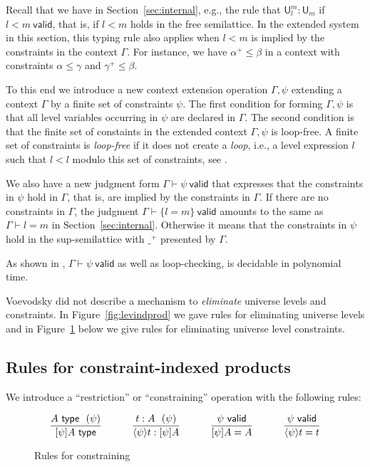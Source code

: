 \documentclass[11pt,a4paper]{article}
\theoremstyle{definition}
\newcommand{\UU}{\mathsf{U}}
\newcommand{\valid}{\mathsf{valid}}
\newcommand{\type}{\mathsf{type}}
\newcommand{\lam}[1]{{\langle}#1{\rangle}}
\newcommand{\set}[1]{\{#1\}}
\begin{document}
Recall that we have in Section~\ref{sec:internal}, e.g., the rule
that $\UU^m_l:\UU_m$ if $l<m~\valid$, that is, if
$l<m$ holds in the free semilattice. %
In the extended system in this section, this typing rule also applies
when $l<m$ is implied by the constraints in the context $\Gamma$.
For instance, we have $\alpha^+\leqslant\beta$ in a context
with constraints $\alpha\leqslant\gamma$ and $\gamma^+\leqslant\beta$.

To this end we introduce a new context extension operation $\Gamma,\psi$
extending a context $\Gamma$ by a finite set of constraints $\psi$.
The first condition for forming $\Gamma,\psi$ is that all level variables
occurring in $\psi$ are declared in $\Gamma$. The second condition
is that the finite set of constaints in the extended context
$\Gamma,\psi$ is loop-free.
A finite set of constraints is {\em loop-free} if it does not
create a {\em loop}, i.e., a level expression $l$ such that $l<l$
modulo this set of constraints, see \cite{bezem-coquand:lattices}.


We also have a new judgment form $\Gamma\vdash\psi~\valid$ that expresses
that the constraints in $\psi$ hold in $\Gamma$, that is,
are implied by the constraints in $\Gamma$. If there are
no constraints in $\Gamma$, the judgment $\Gamma\vdash\set{l=m}~\valid$
amounts to the same as $\Gamma\vdash l=m$ in Section~\ref{sec:internal}.
Otherwise it means that the constraints in $\psi$ hold in the
sup-semilattice with $\_^+$ presented by $\Gamma$.

As shown in \cite{bezem-coquand:lattices}, $\Gamma\vdash\psi~\valid$
as well as loop-checking, is decidable in polynomial time.


Voevodsky \cite {VV} did not describe a mechanism to {\em eliminate}
universe levels and constraints. In Figure~\ref{fig:levindprod} we
gave rules for eliminating universe levels
and in Figure~\ref{fig:restriction} below we give rules
for eliminating universe level constraints.

\subsection*{Rules for constraint-indexed products}%
We introduce a ``restriction'' or ``constraining'' operation with
the following rules:
\begin{figure}[H]
  \caption{Rules for constraining}%
  \label{fig:restriction}
$$
\frac{A~\type~~(\psi)}{[\psi]A~\type}~~~~~~~~~
\frac{{t}:A~~(\psi)}{\lam{\psi}{t}:[\psi]A}~~~~~~~~~
\frac{\psi~\valid}{[\psi]A = A}~~~~~~~~~
\frac{\psi~\valid}{\lam{\psi}{t} = t}
\belowdisplayshortskip 1pt
$$
\end{figure}
\end{document}
